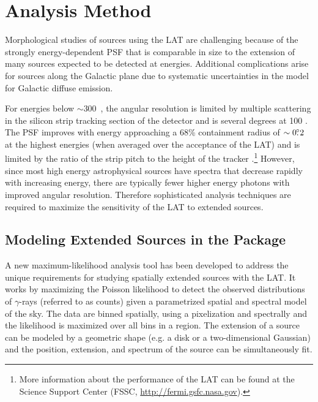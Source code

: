 \section{Analysis Method}

Morphological studies of sources using the LAT are challenging
because of the strongly energy-dependent PSF that is comparable in
size to the extension of many sources expected to be detected at
\gev energies.  Additional complications arise for sources along
the Galactic plane due to systematic uncertainties in the model for
Galactic diffuse emission.  

For energies below $\sim$300~\mev, the angular resolution is limited by
multiple scattering in the silicon strip tracking section
of the detector and is several degrees at 100 \mev.  The PSF improves
with energy approaching a 68\% containment radius of $\sim0\mbox{$.\!\!^\circ$}2$ at
the highest energies (when averaged over the acceptance of the LAT)
and is limited by the ratio of the strip pitch to the height of the tracker
\citep{atwood_2009a_large-telescope,abdo_2009a_on-orbit-calibration,ackermann_2012a_fermi-large}.\footnote{More
information about the performance of the LAT can be found at the \fermi
Science Support Center (FSSC, \url{http://fermi.gsfc.nasa.gov}).} However,
since most high energy astrophysical sources have spectra that decrease
rapidly with increasing energy, there are typically fewer higher
energy photons with improved angular resolution. Therefore sophisticated
analysis techniques are required to maximize the sensitivity of the LAT
to extended sources.

\subsection{Modeling Extended Sources in the \pointlike Package}

A new maximum-likelihood analysis tool has been developed to address the
unique requirements for studying spatially extended sources with the LAT.
It works by maximizing the Poisson 
likelihood to detect the observed distributions of $\gamma$-rays (referred to as counts)
given a parametrized spatial and spectral model of the sky.  
The data are binned spatially, using a \healpix pixelization and spectrally 
\citep{gorski_2005_healpix:-framework} and the likelihood is maximized over all bins in
a region.
The extension of a source can be modeled by a geometric shape
(e.g. a disk or a two-dimensional Gaussian) and the position, extension,
and spectrum of the source can be simultaneously fit.

